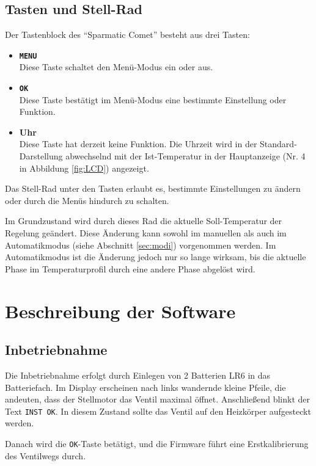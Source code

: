 \documentclass[a5paper,twoside]{article}
\newcommand\SC{"`Sparmatic Comet"'}
\begin{document}
\subsection {
  Tasten und Stell-Rad
}

Der Tastenblock des \SC{} besteht aus drei Tasten:

\begin{itemize}
\item \textbf{\texttt{MENU}}\\ Diese Taste schaltet den Menü-Modus ein oder aus.
\item \textbf{\texttt{OK}}\\ Diese Taste bestätigt im Menü-Modus eine bestimmte
  Einstellung oder Funktion.
\item \textbf{Uhr}\\ Diese Taste hat derzeit keine Funktion.  Die Uhrzeit wird
  in der Standard-Darstellung abwechselnd mit der Ist-Temperatur in der
  Hauptanzeige (Nr. 4 in Abbildung \ref{fig:LCD}) angezeigt.
\end{itemize}

Das Stell-Rad unter den Tasten erlaubt es, bestimmte Einstellungen zu
ändern oder durch die Menüs hindurch zu schalten.

Im Grundzustand wird durch dieses Rad die aktuelle Soll-Temperatur
der Regelung geändert.  Diese Änderung kann sowohl im manuellen als
auch im Automatikmodus (siehe Abschnitt \ref{sec:modi}) vorgenommen
werden.  Im Automatikmodus ist die Änderung jedoch nur so lange
wirksam, bis die aktuelle Phase im Temperaturprofil durch eine
andere Phase abgelöst wird.

\section {
  Beschreibung der Software
}

\subsection {
  Inbetriebnahme
}

Die Inbetriebnahme erfolgt durch Einlegen von 2 Batterien LR6 in das
Batteriefach.  Im Display erscheinen nach links wandernde kleine
Pfeile, die andeuten, dass der Stellmotor das Ventil maximal öffnet.
Anschließend blinkt der Text \texttt{INST OK}.  In diesem Zustand sollte
das Ventil auf den Heizkörper aufgesteckt werden.

Danach wird die \texttt{OK}-Taste betätigt, und die Firmware führt eine
Erstkalibrierung des Ventilwegs durch.
\end{document}
